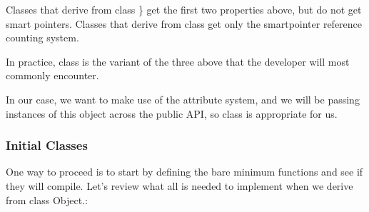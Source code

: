 \documentclass[letterpaper,10pt,english]{sphinxmanual}
\renewcommand{\sphinxcode}[1]{\texttt{\small{#1}}}
\begin{document}
Classes that derive from class \sphinxcode{}\} get the first two
properties above, but do not get smart pointers. Classes that derive from class
\sphinxcode{} get only the smart\sphinxhyphen{}pointer reference counting system.

In practice, class \sphinxcode{} is the variant of the three above that
the  developer will most commonly encounter.

In our case, we want to make use of the attribute system, and we will be passing
instances of this object across the  public API, so class
\sphinxcode{} is appropriate for us.


\subsubsection{Initial Classes}
\label{\detokenize{new-models:initial-classes}}
One way to proceed is to start by defining the bare minimum functions and see if
they will compile. Let’s review what all is needed to implement when we derive
from class Object.:

\begin{sphinxVerbatim}[commandchars=\\\{\}]

 

  

    
     

   
    

    
     

   
    
\end{sphinxVerbatim}
\end{document}
